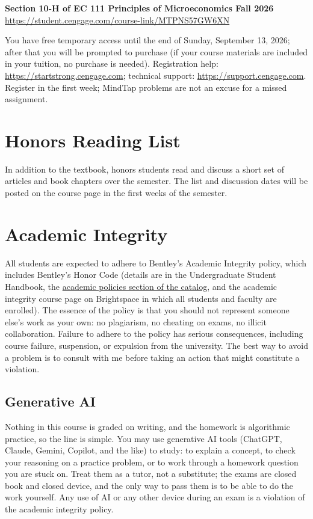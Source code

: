 \documentclass[11pt,letterpaper]{article}
\newcommand{\mindtapsection}{Section 10-H of EC 111 Principles of Microeconomics Fall 2026}
\newcommand{\mindtaplink}{https://student.cengage.com/course-link/MTPNS57GW6XN}
\newcommand{\mindtapaccess}{the end of Sunday, September 13, 2026}
\newcommand{\mindtapsection}{Section 20 of EC 111 Principles of Microeconomics Fall 2026}
\newcommand{\mindtaplink}{https://student.cengage.com/course-link/MTPP8N7GWX7L}
\newcommand{\mindtapaccess}{the end of Sunday, September 13, 2026}
\begin{document}
\begin{center}
\textbf{\mindtapsection}\\
\url{\mindtaplink}
\end{center}

You have free temporary access until \mindtapaccess; after that you will be prompted to purchase (if your course materials are included in your tuition, no purchase is needed). Registration help: \url{https://startstrong.cengage.com}; technical support: \url{https://support.cengage.com}. Register in the first week; MindTap problems are not an excuse for a missed assignment.

\ifdefined\honors
\section*{Honors Reading List}

In addition to the textbook, honors students read and discuss a short set of articles and book chapters over the semester. The list and discussion dates will be posted on the course page in the first weeks of the semester.

\fi
\section*{Academic Integrity}

All students are expected to adhere to Bentley's Academic Integrity policy, which includes Bentley's Honor Code (details are in the Undergraduate Student Handbook, the \href{https://catalog.bentley.edu/undergraduate/academic-policies-procedures/}{academic policies section of the catalog}, and the academic integrity course page on Brightspace in which all students and faculty are enrolled). The essence of the policy is that you should not represent someone else's work as your own: no plagiarism, no cheating on exams, no illicit collaboration. Failure to adhere to the policy has serious consequences, including course failure, suspension, or expulsion from the university. The best way to avoid a problem is to consult with me before taking an action that might constitute a violation.

\subsection*{Generative AI}
Nothing in this course is graded on writing, and the homework is algorithmic practice, so the line is simple. You may use generative AI tools (ChatGPT, Claude, Gemini, Copilot, and the like) to study: to explain a concept, to check your reasoning on a practice problem, or to work through a homework question you are stuck on. Treat them as a tutor, not a substitute; the exams are closed book and closed device, and the only way to pass them is to be able to do the work yourself. Any use of AI or any other device during an exam is a violation of the academic integrity policy.
\end{document}
